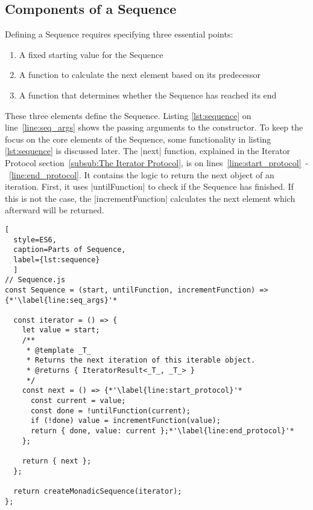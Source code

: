 \subsection{Components of a Sequence}
\label{sub:Components of a Sequence}
Defining a Sequence requires specifying three essential points:
\begin{enumerate}
  \item{A fixed starting value for the Sequence} 
  \item{A function to calculate the next element based on its predecessor} 
  \item{A function that determines whether the Sequence has reached its end} 
\end{enumerate}
These three elements define the Sequence. Listing \ref{lst:sequence} on
line~\ref{line:seq_args} shows the passing arguments to the constructor.
To keep the focus on the core elements of the Sequence, some functionality in 
listing \ref{lst:sequence} is discussed later. The |next| function, explained in 
the Iterator Protocol section~\ref{subsub:The Iterator Protocol}, 
is on lines~\ref{line:start_protocol}~-~\ref{line:end_protocol}. It contains the 
logic to return the next object of an iteration. First, it uses |untilFunction| 
to check if the Sequence has finished. If this is not the case, the
|incrementFunction| calculates the next element which afterward will be
returned.

\begin{lstlisting}[
  style=ES6, 
  caption=Parts of Sequence,
  label={lst:sequence}
  ]
// Sequence.js
const Sequence = (start, untilFunction, incrementFunction) => {*'\label{line:seq_args}'*

  const iterator = () => {
    let value = start;
    /**
     * @template _T_
     * Returns the next iteration of this iterable object.
     * @returns { IteratorResult<_T_, _T_> }
     */
    const next = () => {*'\label{line:start_protocol}'*
      const current = value;
      const done = !untilFunction(current);
      if (!done) value = incrementFunction(value);
      return { done, value: current };*'\label{line:end_protocol}'*
    };

    return { next };
  };

  return createMonadicSequence(iterator);
};
\end{lstlisting}


